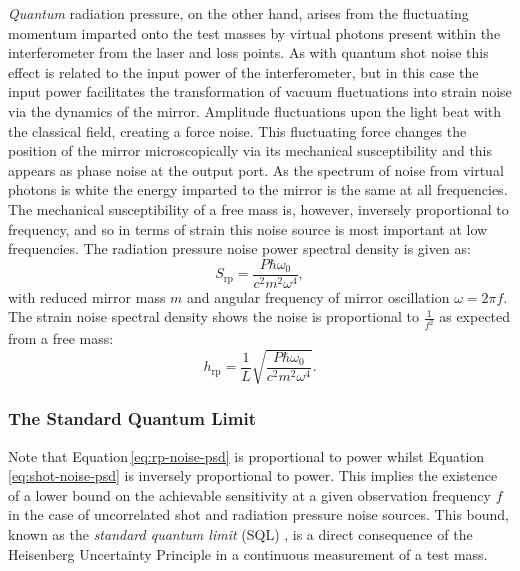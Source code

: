 \emph{Quantum} radiation pressure, on the other hand, arises from the fluctuating momentum imparted onto the test masses by virtual photons present within the interferometer from the laser and loss points. As with quantum shot noise this effect is related to the input power of the interferometer, but in this case the input power facilitates the transformation of vacuum fluctuations into strain noise via the dynamics of the mirror. Amplitude fluctuations upon the light beat with the classical field, creating a force noise. This fluctuating force changes the position of the mirror microscopically via its mechanical susceptibility and this appears as phase noise at the output port. As the spectrum of noise from virtual photons is white the energy imparted to the mirror is the same at all frequencies. The mechanical susceptibility of a free mass is, however, inversely proportional to frequency, and so in terms of strain this noise source is most important at low frequencies. The radiation pressure noise power spectral density is given as:
\begin{equation}
  \label{eq:rp-noise-psd}
  S_{\text{rp}} = \frac{P \hbar \omega_0}{c^2 m^2 \omega^4},
\end{equation}
with reduced mirror mass $m$ and angular frequency of mirror oscillation $\omega = 2 \pi f$. The strain noise spectral density shows the noise is proportional to $\frac{1}{f^2}$ as expected from a free mass:
\begin{equation}
  h_{\text{rp}} = \frac{1}{L} \sqrt{\frac{P \hbar \omega_0}{c^2 m^2 \omega^4}}.
\end{equation}

\subsubsection{\label{sec:sql}The Standard Quantum Limit}
Note that Equation\,\ref{eq:rp-noise-psd} is proportional to power whilst Equation\,\ref{eq:shot-noise-psd} is inversely proportional to power. This implies the existence of a lower bound on the achievable sensitivity at a given observation frequency $f$ in the case of uncorrelated shot and radiation pressure noise sources. This bound, known as the \emph{standard quantum limit} (\gls{SQL}) \cite{Braginsky1967}, is a direct consequence of the Heisenberg Uncertainty Principle in a continuous measurement of a test mass.

